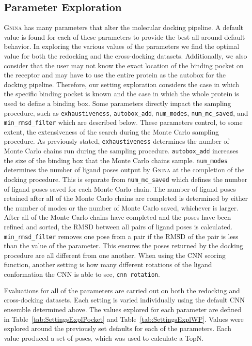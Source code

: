 \documentclass[journal=jcisd8,manuscript=article]{achemso}
\begin{document}
\subsection{Parameter Exploration}
\textsc{Gnina} has many parameters that alter the molecular docking pipeline. A default value is found for each of these parameters to provide the best all around default behavior. In exploring the various values of the parameters we find the optimal value for both the redocking and the cross-docking datasets. Additionally, we also consider that the user may not know the exact location of the binding pocket on the receptor and may have to use the entire protein as the autobox for the docking pipeline. Therefore, our setting exploration considers the case in which the specific binding pocket is known and the case in which the whole protein is used to define a binding box. Some parameters directly impact the sampling procedure, such as \texttt{exhaustiveness}, \texttt{autobox\_add}, \texttt{num\_modes}, \texttt{num\_mc\_saved}, and \texttt{min\_rmsd\_filter} which are described below. These parameters control, to some extent, the extensiveness of the search during the Monte Carlo sampling procedure. As previously stated, \texttt{exhaustiveness} determines the number of Monte Carlo chains run during the sampling procedure. \texttt{autobox\_add} increases the size of the binding box that the Monte Carlo chains sample. \texttt{num\_modes} determines the number of ligand poses output by \textsc{Gnina} at the completion of the docking procedure. This is separate from \texttt{num\_mc\_saved} which defines the number of ligand poses saved for each Monte Carlo chain. The number of ligand poses retained after all of the Monte Carlo chains are completed is determined by either the number of modes or the number of Monte Carlo saved, whichever is larger. After all of the Monte Carlo chains have completed and the poses have been refined and sorted, the RMSD between all pairs of ligand poses is calculated. \texttt{min\_rmsd\_filter} removes one pose from a pair if the RMSD of the pair is less than the value of the parameter. This ensures the poses returned by the docking procedure are all different from one another. When using the CNN scoring function, another setting is how many different rotations of the ligand conformation the CNN is able to see, \texttt{cnn\_rotation}.

Evaluations for all of the parameters are carried out on both the redocking and cross-docking datasets. Each setting is varied individually using the default CNN ensemble determined above. The values explored for each parameter are defined in Table~\ref{tab:SettingsExplPocket} and Table~\ref{tab:SettingsExplWP}. Values were explored around the previously set defaults for each of the parameters. Each value produced a set of poses, which was used to calculate a TopN.
\end{document}
